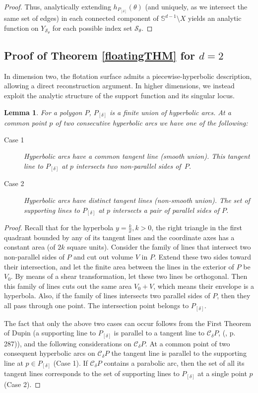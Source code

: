 \documentclass[12pt,letterpaper,reqno]{amsart}
\newtheorem{lemma}{Lemma}
\begin{document}
\begin{proof}
Thus, analytically extending $h_{P_{[\delta]}}(\theta)$ (and uniquely, as we intersect the same set of edges) in each connected component of $\mathbb{S}^{d-1} \setminus X$ yields an analytic function on $Y_\mathcal{S_\theta}$ for each possible index set $\mathcal{S_\theta}$.
\end{proof}

\subsection{Proof of Theorem \ref{floatingTHM} for $d =2$}
In dimension two, the flotation surface admits a piecewise-hyperbolic
description, allowing a direct reconstruction argument. In higher
dimensions, we instead exploit the analytic structure of the support
function and its singular locus.
\begin{lemma}\label{P_Dupin}
For a polygon $P$, $P_{[\delta]}$ is a finite union of hyperbolic arcs. At a common point $p$ of two consecutive hyperbolic arcs we have one of the following:
\begin{description}
    \item[Case 1] Hyperbolic arcs have a common tangent line (smooth union). This tangent line to $P_{[\delta]}$ at $p$ intersects two non-parallel sides of~$P$.
    \item[Case 2] Hyperbolic arcs have distinct tangent lines (non-smooth union). The set of supporting lines to $P_{[\delta]}$ at $p$ intersects a pair of parallel sides of $P$. 
\end{description}
\end{lemma}
\begin{proof}
    Recall that for the hyperbola $y=\frac k x, k>0$, the right triangle in the first quadrant bounded by any of its tangent lines and the coordinate axes has a constant area (of $2k$ square units). 
    Consider the family of lines that intersect two non-parallel sides of $P$ and cut out volume $V$ in $P$. Extend these two sides toward their intersection, and let the finite area between the lines in the exterior of $P$ be $V_0$. By means of a shear transformation, let these two lines be orthogonal. Then this family of lines cuts out the same area $V_0+V$, which means their envelope is a hyperbola.
    Also, if the family of lines intersects two parallel sides of $P$, then they all pass through one point. The intersection point belongs to $P_{[\delta]}$.
    
    The fact that only the above two cases can occur follows from the First Theorem of Dupin (a supporting line to $P_{[\delta]}$ is parallel to a tangent line to $\mathcal{C}_\delta P$, (\cite{VP}, p. 287)), and the following considerations on $\mathcal{C}_\delta P$.
    At a common point of two consequent hyperbolic arcs on $\mathcal{C}_\delta P$ the tangent line is parallel to the supporting line at $p \in P_{[\delta]}$ (Case 1).
    If $\mathcal{C}_\delta P$ contains a parabolic arc, then the set of all its tangent lines corresponds to the set of supporting lines to $P_{[\delta]}$ at a single point $p$ (Case 2).  
\end{proof}
\end{document}
